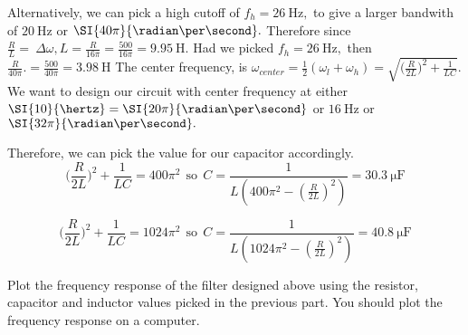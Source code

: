 \begin{enumerate}
{    Alternatively, we can pick a high cutoff of $f_{h} = \SI{26}{\hertz},$ to give a larger bandwith of $\SI{20}{\hertz}$ or $\SI{40 \pi}{\radian\per\second}.$ Therefore since $\frac{R}{L} = \ \Delta \omega, L = \frac{R}{16 \pi} = \frac{500}{16 \pi} = \SI{9.95}{\henry}.$
    Had we picked $f_{h} = \SI{26}{\hertz},$ then $\frac{R}{40 \pi}. = \frac{500}{40 \pi} = \SI{3.98}{\henry}$ \vskip 2pt
    The center frequency, is $\omega_{center} = \frac{1}{2}(\omega_{l} + \omega_{h}) = \sqrt{\big(\frac{R}{2L} \big)^2 + \frac{1}{LC}}.$ We want to design our circuit with center frequency at either $\SI{10}{\hertz} = \SI{20 \pi}{\radian\per\second}$ or $\SI{16}{\hertz}$ or $\SI{32\pi}{\radian\per\second}.$ \vskip 0.5pt

    Therefore, we can pick the value for our capacitor accordingly.
    $$\big(\frac{R}{2L} \big)^2 + \frac{1}{LC} = 400 \pi^2 \ \ \text{so} \ \ C = \frac{1}{L(400 \pi^2 - (\frac{R}{2L})^2)} = \SI{30.3}{\micro\farad}$$

    $$\big(\frac{R}{2L} \big)^2 + \frac{1}{LC} = 1024 \pi^2 \ \ \text{so} \ \ C = \frac{1}{L(1024 \pi^2 - (\frac{R}{2L})^2)} = \SI{40.8}{\micro\farad}$$
  }

  \qitem Plot the frequency response of the filter designed above using the resistor, capacitor and inductor values picked in the previous part. You should plot the frequency response on a computer.

\end{enumerate}

